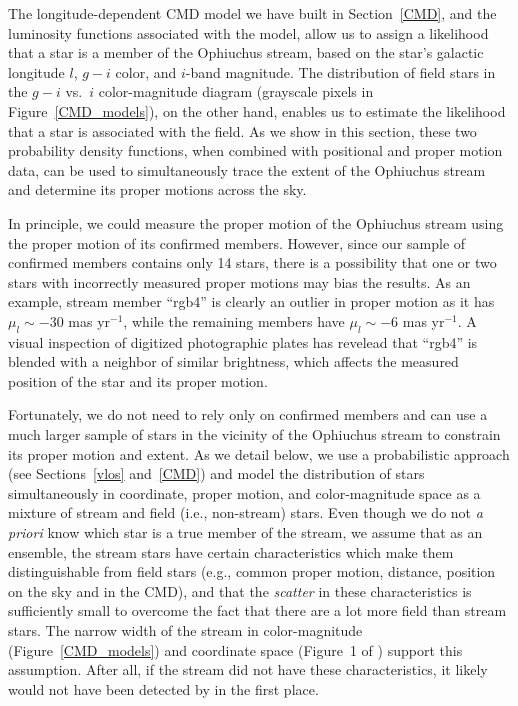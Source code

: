 \documentclass[iop]{emulateapj}
\begin{document}
The longitude-dependent CMD model we have built in Section~\ref{CMD}, and the
luminosity functions associated with the model, allow us to assign a likelihood
that a star is a member of the Ophiuchus stream, based on the star's galactic
longitude $l$, $g-i$ color, and $i$-band magnitude. The distribution of field
stars in the $g-i$ vs.~$i$ color-magnitude diagram (grayscale pixels in
Figure~\ref{CMD_models}), on the other hand, enables us to estimate the
likelihood that a star is associated with the field. As we show in this section,
these two probability density functions, when combined with positional and
proper motion data, can be used to simultaneously trace the extent of the
Ophiuchus stream and determine its proper motions across the sky.

In principle, we could measure the proper motion of the Ophiuchus stream using
the proper motion of its confirmed members. However, since our sample of
confirmed members contains only 14 stars, there is a possibility that one or two
stars with incorrectly measured proper motions may bias the results. As an
example, stream member ``rgb4'' is clearly an outlier in proper motion as it has
$\mu_l\sim-30$ mas yr$^{-1}$, while the remaining members have $\mu_l\sim-6$ mas
yr$^{-1}$. A visual inspection of digitized photographic plates has revelead
that ``rgb4'' is blended with a neighbor of similar brightness, which affects
the measured position of the star and its proper motion.

Fortunately, we do not need to rely only on confirmed members and can use a much
larger sample of stars in the vicinity of the Ophiuchus stream to constrain its
proper motion and extent. As we detail below, we use a probabilistic approach
(see Sections~\ref{vlos} and~\ref{CMD}) and model the distribution of stars
simultaneously in coordinate, proper motion, and color-magnitude space as a
mixture of stream and field (i.e., non-stream) stars. Even though we do not
{\em a priori} know which star is a true member of the stream, we assume that as
an ensemble, the stream stars have certain characteristics which make them
distinguishable from field stars (e.g., common proper motion, distance, position
on the sky and in the CMD), and that the {\em scatter} in these characteristics
is sufficiently small to overcome the fact that there are a lot more field than
stream stars. The narrow width of the stream in color-magnitude
(Figure~\ref{CMD_models}) and coordinate space (Figure~1 of \citealt{ber14b})
support this assumption. After all, if the stream did not have these
characteristics, it likely would not have been detected by \citet{ber14b} in the
first place.
\end{document}
